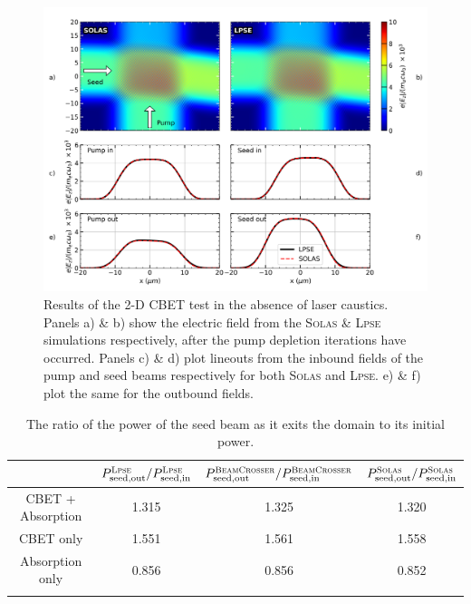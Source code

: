 \begin{figure}[t!]
    \includegraphics[width=1.0\linewidth]{Numerics/Images/CBET_test_nocaustics.png}
    \centering
    \caption{Results of the 2-D \ac{CBET} test in the absence of laser caustics.
    Panels a) \& b) show the electric field from the \textsc{Solas} \& \textsc{Lpse} simulations respectively, after the pump depletion iterations have occurred.
    Panels c) \& d) plot lineouts from the inbound fields of the pump and seed beams respectively for both \textsc{Solas} and \textsc{Lpse}.
    e) \& f) plot the same for the outbound fields.}%
    \label{fig:SOLAS_CBET_test_nocaustics}
\end{figure}

\begin{table}[ht]
    \centering
    \caption{The ratio of the power of the seed beam as it exits the domain to its initial power.}
    \begin{tabular}{cccc} \hhline{====}
    & $P_{\text{seed,out}}^{\textsc{Lpse}}/P_{\text{seed,in}}^{\textsc{Lpse}}$ & $P_{\text{seed,out}}^{\textsc{BeamCrosser}}/P_{\text{seed,in}}^{\textsc{BeamCrosser}}$ & $P_{\text{seed,out}}^{\textsc{Solas}}/P_{\text{seed,in}}^{\textsc{Solas}}$ \\ 
    \midrule
    CBET + Absorption & 1.315 & 1.325 & 1.320 \\
    CBET only & 1.551 & 1.561 & 1.558 \\
    Absorption only & 0.856 & 0.856 & 0.852 \\ \hhline{====}
    \end{tabular}%
    \label{tab:nocaustic_CBET_table}
\end{table}

